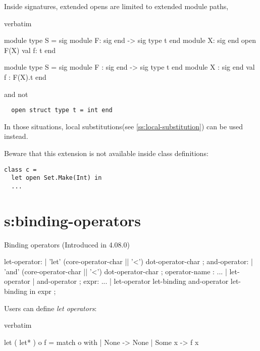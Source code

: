 {Inside signatures, extended opens are limited to extended module paths,
\begin{camlexample}{verbatim}
\begin{caml}
\begin{camlinput}
module type S = sig
  module F: sig end -> sig type t end
  module X: sig end
  open F(X)
  val f: t
end
\end{camlinput}
\begin{camloutput}
module type S =
  sig
    module F : sig end -> sig type t end
    module X : sig end
    val f : F(X).t
  end
\end{camloutput}
\end{caml}
\end{camlexample}

and not

\begin{verbatim}
  open struct type t = int end
\end{verbatim}

In those situations, local substitutions(see \ref{ss:local-substitution})
can be used instead.

Beware that this extension is not available inside class definitions:

\begin{verbatim}
class c =
  let open Set.Make(Int) in
  ...
\end{verbatim}

\section{s:binding-operators}{Binding operators}
(Introduced in 4.08.0)

\begin{syntax}
let-operator:
 | 'let' (core-operator-char || '<') { dot-operator-char }
;
and-operator:
 | 'and' (core-operator-char || '<') { dot-operator-char }
;
operator-name :
          ...
        | let-operator
        | and-operator
;
expr:
          ...
        | let-operator let-binding { and-operator let-binding } in expr
;
\end{syntax}

Users can define {\em let operators}:

\begin{camlexample}{verbatim}
\begin{caml}
\begin{camlinput}
let ( let* ) o f =
  match o with
  | None -> None
  | Some x -> f x


\end{camlinput}
\end{caml}
\end{camlexample}}
